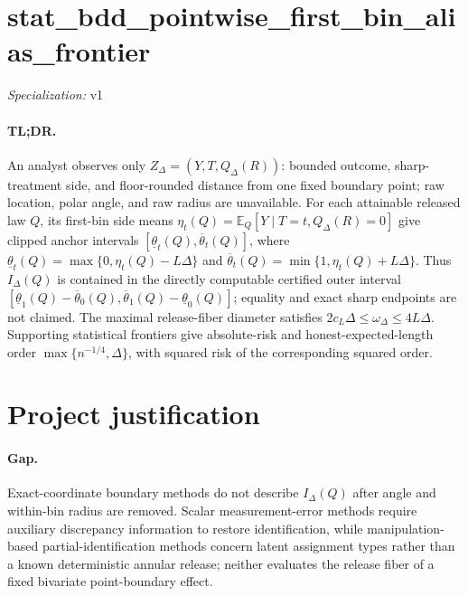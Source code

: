 \documentclass{article}
\begin{document}
\sloppy

\section*{stat\_\allowbreak{}bdd\_\allowbreak{}pointwise\_\allowbreak{}first\_\allowbreak{}bin\_\allowbreak{}alias\_\allowbreak{}frontier}

\noindent\textit{Specialization:} v1\par

\paragraph{TL;DR.} An analyst observes only \(Z_\Delta=(Y,T,Q_\Delta(R))\): bounded outcome, sharp-treatment side, and floor-rounded distance from one fixed boundary point; raw location, polar angle, and raw radius are unavailable. For each attainable released law \(Q\), its first-bin side means \(\eta_t(Q)=\mathbb E_Q[Y\mid T=t,Q_\Delta(R)=0]\) give clipped anchor intervals \([\underline{\theta}_t(Q),\overline{\theta}_t(Q)]\), where \(\underline{\theta}_t(Q)=\max\{0,\eta_t(Q)-L\Delta\}\) and \(\overline{\theta}_t(Q)=\min\{1,\eta_t(Q)+L\Delta\}\). Thus \(I_\Delta(Q)\) is contained in the directly computable certified outer interval \([\underline{\theta}_1(Q)-\overline{\theta}_0(Q),\overline{\theta}_1(Q)-\underline{\theta}_0(Q)]\); equality and exact sharp endpoints are not claimed. The maximal release-fiber diameter satisfies \(2c_L\Delta\leq\omega_\Delta\leq4L\Delta\). Supporting statistical frontiers give absolute-risk and honest-expected-length order \(\max\{n^{-1/4},\Delta\}\), with squared risk of the corresponding squared order.

\section{Project justification}

\paragraph{Gap.} Exact-coordinate boundary methods do not describe \(I_\Delta(Q)\) after angle and within-bin radius are removed.  Scalar measurement-error methods require auxiliary discrepancy information to restore identification, while manipulation-based partial-identification methods concern latent assignment types rather than a known deterministic annular release; neither evaluates the release fiber of a fixed bivariate point-boundary effect.
\end{document}
